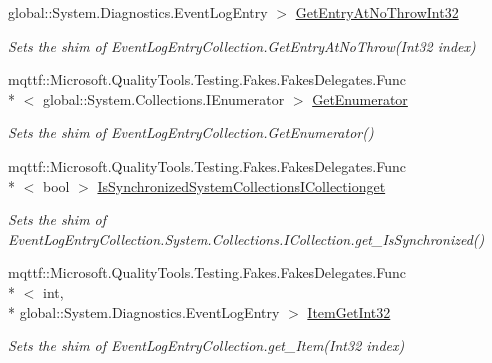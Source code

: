 \begin{DoxyCompactItemize}
global\-::\-System.\-Diagnostics.\-Event\-Log\-Entry $>$ \hyperlink{class_system_1_1_diagnostics_1_1_fakes_1_1_shim_event_log_entry_collection_a3ee42a107182e3566f8a8c80ca0c7d21}{Get\-Entry\-At\-No\-Throw\-Int32}
\begin{DoxyCompactList}\small\item\em Sets the shim of Event\-Log\-Entry\-Collection.\-Get\-Entry\-At\-No\-Throw(\-Int32 index)\end{DoxyCompactList}\item 
mqttf\-::\-Microsoft.\-Quality\-Tools.\-Testing.\-Fakes.\-Fakes\-Delegates.\-Func\\*
$<$ global\-::\-System.\-Collections.\-I\-Enumerator $>$ \hyperlink{class_system_1_1_diagnostics_1_1_fakes_1_1_shim_event_log_entry_collection_ae9c7e3963a18166e4c06dfb8f2319dab}{Get\-Enumerator}
\begin{DoxyCompactList}\small\item\em Sets the shim of Event\-Log\-Entry\-Collection.\-Get\-Enumerator()\end{DoxyCompactList}\item 
mqttf\-::\-Microsoft.\-Quality\-Tools.\-Testing.\-Fakes.\-Fakes\-Delegates.\-Func\\*
$<$ bool $>$ \hyperlink{class_system_1_1_diagnostics_1_1_fakes_1_1_shim_event_log_entry_collection_ac5a132ce5957031fd8fbc2b34b621eaf}{Is\-Synchronized\-System\-Collections\-I\-Collectionget}
\begin{DoxyCompactList}\small\item\em Sets the shim of Event\-Log\-Entry\-Collection.\-System.\-Collections.\-I\-Collection.\-get\-\_\-\-Is\-Synchronized()\end{DoxyCompactList}\item 
mqttf\-::\-Microsoft.\-Quality\-Tools.\-Testing.\-Fakes.\-Fakes\-Delegates.\-Func\\*
$<$ int, \\*
global\-::\-System.\-Diagnostics.\-Event\-Log\-Entry $>$ \hyperlink{class_system_1_1_diagnostics_1_1_fakes_1_1_shim_event_log_entry_collection_a33ab105e1174a3dd3427a8e2fb27635a}{Item\-Get\-Int32}
\begin{DoxyCompactList}\small\item\em Sets the shim of Event\-Log\-Entry\-Collection.\-get\-\_\-\-Item(\-Int32 index)\end{DoxyCompactList}\item 

\end{DoxyCompactItemize}
